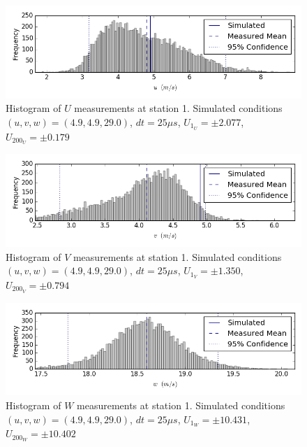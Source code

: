 \begin{figure}[H]
\centering
\includegraphics[width=6in]{figs/Ely_May28th01001/uncertainty_Ely_May28th01001_U}
\caption{Histogram of $U$ measurements at station 1. Simulated conditions $(u,v,w)=(4.9, 4.9, 29.0)$, $dt=25 \mu s$, $U_1_U=\pm 2.077$, $U_200_U=\pm 0.179$}
\label{fig:uncertainty_Ely_May28th01001_U}
\end{figure}


\begin{figure}[H]
\centering
\includegraphics[width=6in]{figs/Ely_May28th01001/uncertainty_Ely_May28th01001_V}
\caption{Histogram of $V$ measurements at station 1. Simulated conditions $(u,v,w)=(4.9, 4.9, 29.0)$, $dt=25 \mu s$, $U_1_V=\pm 1.350$, $U_200_V=\pm 0.794$}
\label{fig:uncertainty_Ely_May28th01001_V}
\end{figure}


\begin{figure}[H]
\centering
\includegraphics[width=6in]{figs/Ely_May28th01001/uncertainty_Ely_May28th01001_W}
\caption{Histogram of $W$ measurements at station 1. Simulated conditions $(u,v,w)=(4.9, 4.9, 29.0)$, $dt=25 \mu s$, $U_1_W=\pm 10.431$, $U_200_W=\pm 10.402$}
\label{fig:uncertainty_Ely_May28th01001_W}
\end{figure}


